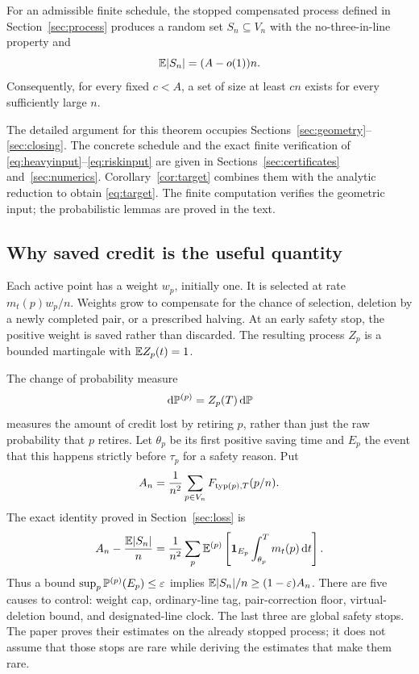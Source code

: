 \begin{theorem}\label{thm:bridge}
For an admissible finite schedule, the stopped compensated process
defined in Section~\ref{sec:process} produces a random set \(S_n\subseteq
V_n\) with the no-three-in-line property and
\[
 \mathbb E|S_n|=(A-o(1))n.
\]
Consequently, for every fixed \(c<A\), a set of size at least \(cn\)
exists for every sufficiently large \(n\).
\end{theorem}

The detailed argument for this theorem occupies
Sections~\ref{sec:geometry}--\ref{sec:closing}. The concrete schedule
and the exact finite verification of
\eqref{eq:heavyinput}--\eqref{eq:riskinput} are given in
Sections~\ref{sec:certificates} and~\ref{sec:numerics}.
Corollary~\ref{cor:target} combines them with the analytic reduction
to obtain \eqref{eq:target}. The finite computation verifies the
geometric input; the probabilistic lemmas are proved in the text.

\subsection{Why saved credit is the useful quantity}
Each active point has a weight \(w_p\), initially one. It is selected at
rate \(m_t(p)w_p/n\). Weights grow to compensate for the chance of
selection, deletion by a newly completed pair, or a prescribed
halving. At an early safety stop, the positive weight is saved rather
than discarded. The resulting process \(Z_p\) is a bounded martingale
with \(\mathbb E Z_p(t)=1\).

The change of probability measure
\[
 \,\mathrm d\mathbb P^{(p)}=Z_p(T)\,\mathrm d\mathbb P
\]
measures the amount of credit lost by retiring \(p\), rather than just
the raw probability that \(p\) retires. Let \(\theta_p\) be its first
positive saving time and \(E_p\) the event that this happens strictly
before \(\tau_p\) for a safety reason. Put
\[
 A_n=\frac1{n^2}\sum_{p\in V_n}F_{\operatorname{typ}(p),T}(p/n).
\]
The exact identity proved in Section~\ref{sec:loss} is
\begin{equation}\label{eq:previewloss}
 A_n-\frac{\mathbb E|S_n|}{n}
 =\frac1{n^2}\sum_p\mathbb E^{(p)}\left[
 \mathbf 1_{E_p}\int_{\theta_p}^{T}m_t(p)\,\mathrm d t\right].
\end{equation}
Thus a bound \(\sup_p\mathbb P^{(p)}(E_p)\le\varepsilon\) implies
\(\mathbb E|S_n|/n\ge(1-\varepsilon)A_n\).
There are five causes to control: weight cap, ordinary-line tag,
pair-correction floor, virtual-deletion bound, and designated-line clock.
The last three are global safety stops. The paper proves their estimates
on the already stopped process; it does not assume that those stops
are rare while deriving the estimates that make them rare.

